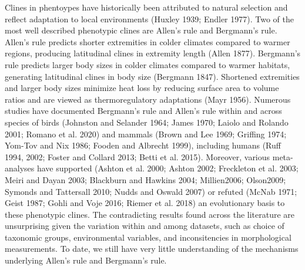 \documentclass[]{article}
\begin{document}
Clines in phentoypes have historically been attributed to natural
selection and reflect adaptation to local environments (Huxley 1939;
Endler 1977). Two of the most well described phenotypic clines are
Allen's rule and Bergmann's rule. Allen's rule predicts shorter
extremities in colder climates compared to warmer regions, producing
latitudinal clines in extremity length (Allen 1877). Bergmann's rule
predicts larger body sizes in colder climates compared to warmer
habitats, generating latitudinal clines in body size (Bergmann 1847).
Shortened extremities and larger body sizes minimize heat loss by
reducing surface area to volume ratios and are viewed as
thermoregulatory adaptations (Mayr 1956). Numerous studies have
documented Bergmann's rule and Allen's rule within and across species of
birds (Johnston and Selander 1964; James 1970; Laiolo and Rolando 2001;
Romano et al. 2020) and mammals (Brown and Lee 1969; Griffing 1974;
Yom-Tov and Nix 1986; Fooden and Albrecht 1999), including humans (Ruff
1994, 2002; Foster and Collard 2013; Betti et al. 2015). Moreover,
various meta-analyses have supported (Ashton et al. 2000; Ashton 2002;
Freckleton et al. 2003; Meiri and Dayan 2003; Blackburn and Hawkins
2004; Millien2006; Olson2009; Symonds and Tattersall 2010; Nudds and
Oswald 2007) or refuted (McNab 1971; Geist 1987; Gohli and Voje 2016;
Riemer et al. 2018) an evolutionary basis to these phenotypic clines.
The contradicting results found across the literature are unsurprising
given the variation within and among datasets, such as choice of
taxonomic groups, environmental variables, and inconsitencies in
morphological measurements. To date, we still have very little
understanding of the mechanisms underlying Allen's rule and Bergmann's
rule.
\end{document}
